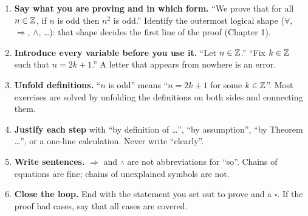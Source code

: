 \vspace{6pt}
\begin{strategy}
\begin{enumerate}
\item \textbf{Say what you are proving and in which form.} ``We prove that for all $n\in\mathbb{Z}$, if $n$ is odd then $n^2$ is odd.'' Identify the outermost logical shape ($\forall$, $\Rightarrow$, $\wedge$, \dots): that shape decides the first line of the proof (Chapter 1).
\item \textbf{Introduce every variable before you use it.} ``Let $n\in\mathbb{Z}$.'' ``Fix $k\in\mathbb{Z}$ such that $n=2k+1$.'' A letter that appears from nowhere is an error.
\item \textbf{Unfold definitions.} ``$n$ is odd'' means ``$n=2k+1$ for some $k\in\mathbb{Z}$''. Most exercises are solved by unfolding the definitions on both sides and connecting them.
\item \textbf{Justify each step} with ``by definition of \dots'', ``by assumption'', ``by Theorem \dots'', or a one-line calculation. Never write ``clearly''.
\item \textbf{Write sentences.} $\Rightarrow$ and $\therefore$ are not abbreviations for ``so''. Chains of equations are fine; chains of unexplained symbols are not.
\item \textbf{Close the loop.} End with the statement you set out to prove and a $\square$. If the proof had cases, say that all cases are covered.
\end{enumerate}
\end{strategy}
